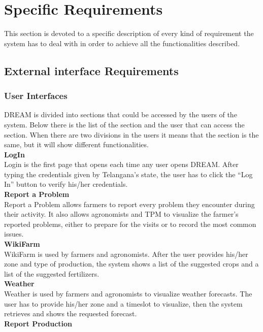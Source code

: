 \section{Specific Requirements}
This section is devoted to a specific description of every kind of requirement the system has to deal with in order to achieve all the functionalities described.
\subsection{External interface Requirements}
\subsubsection{User Interfaces}
DREAM is divided into sections that could be accessed by the users of the system. Below there is the list of the section and the user that can access the section. When there are two divisions in the users it means that the section is the same, but it will show different functionalities.\\
\newline
\textbf{LogIn}\\
Login is the first page that opens each time any user opens DREAM. After typing the credentials given by Telangana’s state, the user has to click the “Log In” button to verify his/her credentials.\\
\newline
\textbf{Report a Problem}\\
Report a Problem allows farmers to report every problem they encounter during their activity. It also allows agronomists and TPM to visualize the farmer’s reported problems, either to prepare for the visits or to record the most common issues.\\
\newline
\textbf{WikiFarm}\\
WikiFarm is used by farmers and agronomists. After the user provides his/her zone and type of production, the system shows a list of the suggested crops and a list of the suggested fertilizers.\\
\newline
\textbf{Weather}\\
Weather is used by farmers and agronomists to visualize weather forecasts. The user has to provide his/her zone and a timeslot to visualize, then the system retrieves and shows the requested forecast.\\
\newline
\textbf{Report Production}\\
